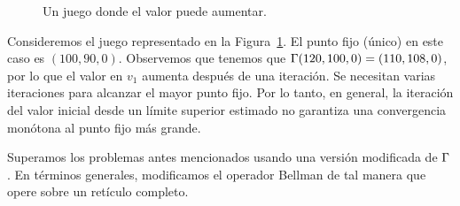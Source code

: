 \begin{figure}
\centering
{}
\caption{Un juego donde el valor puede aumentar.} \label{fig:overflow}
\end{figure}

\begin{example}\label{ex:overflow}
Consideremos el juego representado en la Figura~\ref{fig:overflow}.
El punto fijo (único) en este caso es $(100,90,0)$. Observemos que tenemos que $\Gamma(120,100,0) = (110, 108, 0)$, por lo que el valor en $v_1$ aumenta después de una iteración. Se necesitan varias iteraciones para alcanzar el mayor punto fijo. Por lo tanto, en general, la iteración del valor inicial desde un límite superior estimado no garantiza una convergencia monótona al punto fijo más grande.
\end{example}

Superamos los problemas antes mencionados usando una versión modificada de $\Gamma$. En términos generales, modificamos el operador Bellman de tal manera que opere sobre un retículo completo.

